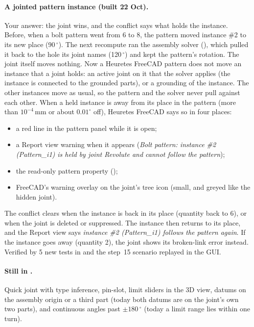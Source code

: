 \paragraph{A jointed pattern instance (built 22 Oct).} Your answer: the joint wins, and the conflict says what holds
the instance. Before, when a bolt pattern went from 6 to 8, the pattern moved instance \#2 to its new place
(90\,$^\circ$). The next recompute ran the assembly solver (), which pulled it back to the hole its
joint names (120\,$^\circ$) and kept the pattern's rotation. The joint itself moves nothing. Now a Heuretes FreeCAD pattern
does not move an instance that a joint holds: an active joint on it that the solver applies (the instance is connected
to the grounded parts), or a grounding of the instance. The other instances move as usual, so the pattern and the
solver never pull against each other. When a held instance is away from its place in the pattern (more than
$10^{-4}$\,mm or about $0.01^\circ$ off), Heuretes FreeCAD says so in four places:
\begin{itemize}[nosep]
  \item a red line in the pattern panel while it is open;
  \item a Report view warning when it appears (\emph{Bolt pattern: instance \#2 (Pattern\_i1) is held by joint
        Revolute and cannot follow the pattern});
  \item the read-only pattern property  ();
  \item FreeCAD's warning overlay on the joint's tree icon (small, and greyed like the hidden joint).
\end{itemize}
The conflict clears when the instance is back in its place (quantity back to 6), or when the joint is deleted or
suppressed. The instance then returns to its place, and the Report view says \emph{instance \#2 (Pattern\_i1) follows
the pattern again}. If the instance goes away (quantity 2), the joint shows its broken-link error instead. Verified by 5 new
tests in  and the step~15 scenario replayed in the GUI.

\paragraph{Still in .} Quick joint with type inference, pin-slot, limit sliders in the 3D view, datums on
the assembly origin or a third part (today both datums are on the joint's own two parts), and continuous angles past
$\pm 180\,^\circ$ (today a limit range lies within one turn).
